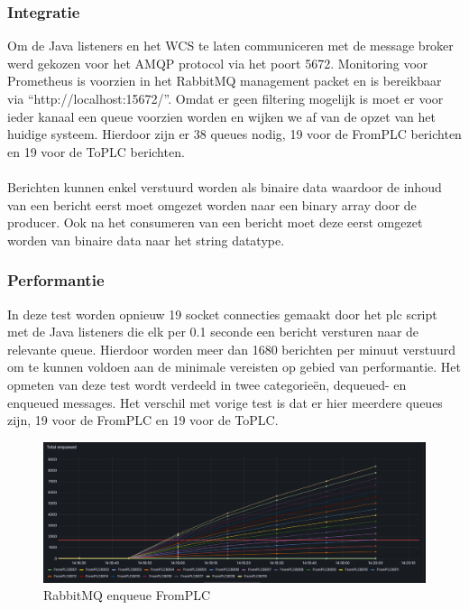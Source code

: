 \subsubsection{Integratie}
Om de Java listeners en het WCS te laten communiceren met de message broker werd gekozen voor het AMQP protocol via het poort 5672.
Monitoring voor Prometheus is voorzien in het RabbitMQ management packet en is bereikbaar via ``http://localhost:15672/''.
Omdat er geen filtering mogelijk is moet er voor ieder kanaal een queue voorzien worden en wijken we af van de opzet van het huidige systeem.
Hierdoor zijn er 38 queues nodig, 19 voor de FromPLC berichten en 19 voor de ToPLC berichten.
\\\\
Berichten kunnen enkel verstuurd worden als binaire data waardoor de inhoud van een bericht eerst moet omgezet worden naar een binary array door de producer.
Ook na het consumeren van een bericht moet deze eerst omgezet worden van binaire data naar het string datatype.


\subsubsection{Performantie}
In deze test worden opnieuw 19 socket connecties gemaakt door het plc script met de Java listeners die elk per 0.1 seconde een bericht versturen naar de relevante queue.
Hierdoor worden meer dan 1680 berichten per minuut verstuurd om te kunnen voldoen aan de minimale vereisten op gebied van performantie.
Het opmeten van deze test wordt verdeeld in twee categorieën, dequeued- en enqueued messages.
Het verschil met vorige test is dat er hier meerdere queues zijn, 19 voor de FromPLC en 19 voor de ToPLC. 

\begin{figure}[h!]
  \centering
  \includegraphics[width=.95\textwidth]{img/rabbitmq-enqueue-count-FromPLC.png}
  \caption{\label{fig:rabbitmq_enqueue_fromplc_count}RabbitMQ enqueue FromPLC}
\end{figure}

